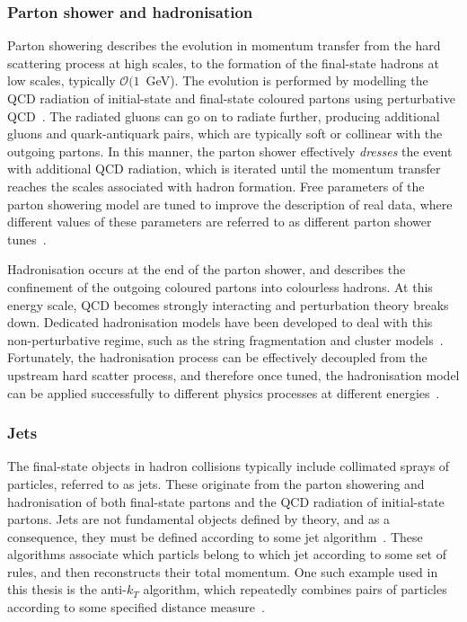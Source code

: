 \subsubsection{Parton shower and hadronisation}
Parton showering describes the evolution in momentum transfer from the hard scattering process at high scales, to the formation of the final-state hadrons at low scales, typically $\mathcal{O}(1$~GeV). The evolution is performed by modelling the QCD radiation of initial-state and final-state coloured partons using perturbative QCD~\cite{Buckley:2011ms}. The radiated gluons can go on to radiate further, producing additional gluons and quark-antiquark pairs, which are typically soft or collinear with the outgoing partons. In this manner, the parton shower effectively \textit{dresses} the event with additional QCD radiation, which is iterated until the momentum transfer reaches the scales associated with hadron formation. Free parameters of the parton showering model are tuned to improve the description of real data, where different values of these parameters are referred to as different parton shower tunes~\cite{Khachatryan:2015pea,Sirunyan:2019dfx}.

Hadronisation occurs at the end of the parton shower, and describes the confinement of the outgoing coloured partons into colourless hadrons. At this energy scale, QCD becomes strongly interacting and perturbation theory breaks down. Dedicated hadronisation models have been developed to deal with this non-perturbative regime, such as the string fragmentation and cluster models~\cite{Andersson:1983ia,Andersson:1998tv,Amati:1979fg}. Fortunately, the hadronisation process can be effectively decoupled from the upstream hard scatter process, and therefore once tuned, the hadronisation model can be applied successfully to different physics processes at different energies~\cite{Buckley:2011ms}.

\subsubsection{Jets}
The final-state objects in hadron collisions typically include collimated sprays of particles, referred to as jets. These originate from the parton showering and hadronisation of both final-state partons and the QCD radiation of initial-state partons. Jets are not fundamental objects defined by theory, and as a consequence, they must be defined according to some jet algorithm~\cite{Salam:2009jx}. These algorithms associate which particls belong to which jet according to some set of rules, and then reconstructs their total momentum. One such example used in this thesis is the anti-$k_T$ algorithm, which repeatedly combines pairs of particles according to some specified distance measure~\cite{Cacciari:2008gp}.

